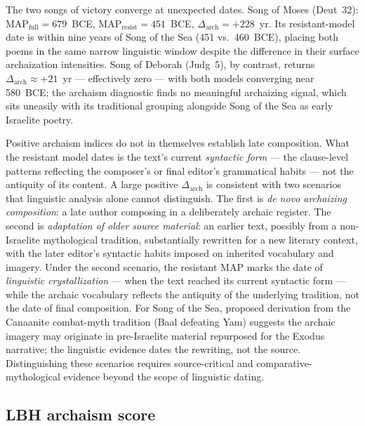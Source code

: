 \documentclass[10pt,letterpaper]{article}
\begin{document}
The two songs of victory converge at unexpected dates.  Song of Moses
(Deut~32): $\text{MAP}_{\text{full}} = 679$~BCE,
$\text{MAP}_{\text{resist}} = 451$~BCE, $\Delta_{\text{arch}} = +228$~yr.
Its resistant-model date is within nine years of Song of the Sea
(451 vs.\ 460~BCE), placing both poems in the same narrow linguistic
window despite the difference in their surface archaization intensities.
Song of Deborah (Judg~5), by contrast, returns $\Delta_{\text{arch}}
\approx +21$~yr --- effectively zero --- with both models converging near
580~BCE; the archaism diagnostic finds no meaningful archaizing signal,
which sits uneasily with its traditional grouping alongside Song of the
Sea as early Israelite poetry.

Positive archaism indices do not in themselves establish late composition.
What the resistant model dates is the text's current \emph{syntactic
form} --- the clause-level patterns reflecting the composer's or final
editor's grammatical habits --- not the antiquity of its content.
A large positive $\Delta_{\text{arch}}$ is consistent with two scenarios
that linguistic analysis alone cannot distinguish.  The first is
\emph{de novo archaizing composition}: a late author composing in a
deliberately archaic register.  The second is \emph{adaptation of older
source material}: an earlier text, possibly from a non-Israelite
mythological tradition, substantially rewritten for a new literary
context, with the later editor's syntactic habits imposed on inherited
vocabulary and imagery.  Under the second scenario, the resistant MAP
marks the date of \emph{linguistic crystallization} --- when the text
reached its current syntactic form --- while the archaic vocabulary
reflects the antiquity of the underlying tradition, not the date of final
composition.  For Song of the Sea, proposed derivation from the Canaanite
combat-myth tradition (Baal defeating Yam) suggests the archaic imagery
may originate in pre-Israelite material repurposed for the Exodus
narrative; the linguistic evidence dates the rewriting, not the source.
Distinguishing these scenarios requires source-critical and
comparative-mythological evidence beyond the scope of linguistic dating.

\subsection*{LBH archaism score}
\end{document}
